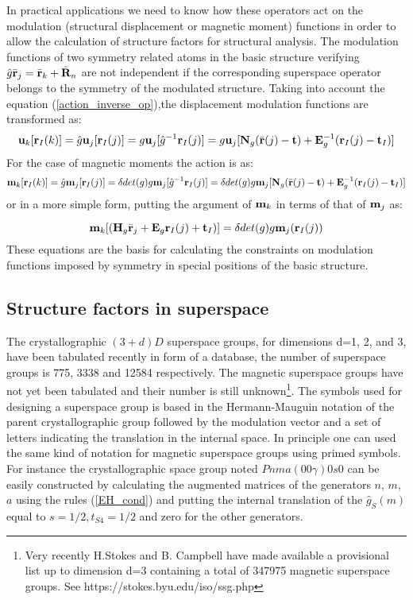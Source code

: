 \documentclass[10pt]{article}
\begin{document}
In practical applications we need to know how these operators act on the modulation (structural displacement or magnetic moment) functions in order to allow the calculation of structure factors for structural analysis.
The modulation functions of two symmetry related atoms in the basic structure verifying $ \hat g \bar {\bf r}_j=\bar {\bf r}_{k} + \bar{\bf R}_n$ are not independent if the corresponding superspace operator belongs to the symmetry of the modulated structure. Taking into account the equation (\ref{action_inverse_op}),the displacement modulation functions are transformed as:\\
\begin{equation} \label{tranf_displ}
{\bf u}_k[{\bf r}_I (k)]=\hat g {\bf u}_j [{\bf r}_I (j) ]= g{\bf u}_j[\hat g^{-1}{\bf r}_I (j) ] = g {\bf u}_j[{\bf N}_g(\bar {\bf r}(j)-{\bf t})+{\bf E}^{-1}_g ({\bf r}_I (j)-{\bf t}_I)]
\end{equation}
For the case of magnetic moments the action is as:
\begin{equation} \label{tranf_mom}
{\bf m}_k[{\bf r}_I (k)]=\hat g {\bf m}_j [{\bf r}_I (j) ]= \delta det(g) g{\bf m}_j[\hat g^{-1}{\bf r}_I (j) ] = \delta det(g) g {\bf m}_j[{\bf N}_g(\bar {\bf r}(j)-{\bf t})+{\bf E}^{-1}_g ({\bf r}_I (j)-{\bf t}_I)]
\end{equation}
or in a more simple form, putting the argument of ${\bf m}_k$ in terms of that of ${\bf m}_j$ as:

\begin{equation} \label{tranf_mom2} 
{\bf m}_k[({\bf H}_g \bar{\bf r}_j + {\bf E}_g{\bf r}_{I}(j) + {\bf t}_I)]= \delta det(g) g{\bf m}_j({\bf r}_{I}(j)) 
\end{equation}
These equations are the basis for calculating the constraints on modulation functions imposed by symmetry in special positions of the basic structure.

\subsection{Structure factors in superspace}
The crystallographic $(3+d)D$ superspace groups, for dimensions d=1, 2, and 3, have been tabulated recently \cite{Stokes_genSuperSpace} in form of a database, the number of superspace groups is 775, 3338 and 12584 respectively. The magnetic superspace groups have not yet been tabulated and their number is still unknown{\footnote{Very recently H.Stokes and B. Campbell have made available a provisional list up to dimension d=3 containing a total of 347975 magnetic superspace groups. See https://stokes.byu.edu/iso/ssg.php}}. The symbols used for designing a superspace group is based in the Hermann-Mauguin notation of the parent crystallographic group followed by the modulation vector and a set of letters indicating the translation in the internal space. In principle one can used the same kind of notation for magnetic superspace groups using primed symbols. For instance the crystallographic space group noted $Pnma(00\gamma)0s0$ can be easily constructed by calculating the augmented matrices of the generators $n$, $m$, $a$ using the rules (\ref{EH_cond}) and putting the internal translation of the $\hat g_S(m)$ equal to $s=1/2, t_{S4}=1/2$ and zero for the other generators.
\end{document}

